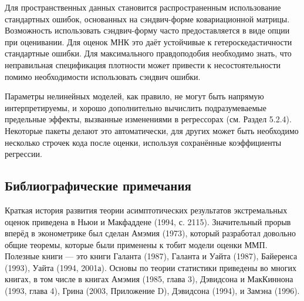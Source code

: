 Для пространственных данных становится распространенным использование стандартных ошибок, основанных на сэндвич-форме ковариационной матрицы. Возможность использовать сэндвич-форму часто предоставляется в виде опции при оценивании. Для оценок МНК это даёт устойчивые к гетероскедастичности стандартные ошибки. Для максимального правдоподобия необходимо знать, что неправильная спецификация плотности может привести к несостоятельности помимо  необходимости использовать сэндвич ошибки.

Параметры нелинейных моделей, как правило, не могут быть напрямую интерпретируемы, и хорошо дополнительно вычислить подразумеваемые предельные эффекты, вызванные изменениями в регрессорах (см. Раздел 5.2.4). Некоторые пакеты делают это автоматически, для других может быть необходимо несколько строчек кода после оценки, используя сохранённые коэффициенты регрессии.

\subsection{Библиографические примечания}

Краткая история развития теории асимптотических результатов экстремальных оценок приведена в Ньюи и Макфаддене (1994, с. 2115). Значительный прорыв вперёд в эконометрике был сделан Амэмия (1973), который разработал довольно общие теоремы, которые были применены к тобит модели оценки ММП. Полезные книги --- это книги Галанта (1987), Галанта и Уайта (1987), Байеренса (1993), Уайта (1994, 2001а). Основы по теории статистики приведены во многих книгах, в том числе в книгах Амэмия (1985, глава 3), Дэвидсона и МакКиннона (1993, глава 4), Грина (2003, Приложение D), Дэвидсона (1994), и Замэна (1996).

